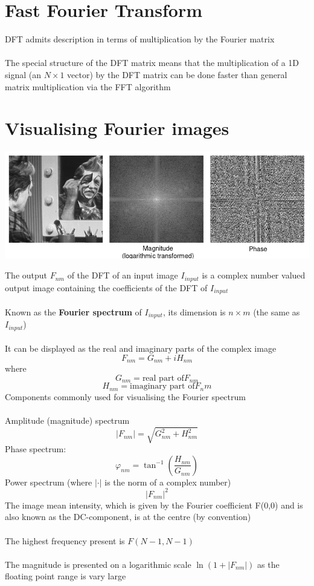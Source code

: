 \documentclass{article}[18pt]
\begin{document}
\section{Fast Fourier Transform}
DFT admits description in terms of multiplication by the Fourier matrix\\
\\
The special structure of the DFT matrix means that the multiplication of a 1D signal (an $N\times 1$ vector) by the DFT matrix can be done faster than general matrix multiplication via the FFT algorithm
\section{Visualising Fourier images}
\begin{center}
	\includegraphics[scale=0.7]{visualise}
\end{center}

The output $F_{nm}$ of the DFT of an input image $I_{input}$ is a complex number valued output image containing the coefficients of the DFT of $I_{input}$\\
\\
Known as the \textbf{Fourier spectrum} of $I_{input}$, its dimension is $n\times m$ (the same as $I_{input}$)\\
\\
It can be displayed as the real and imaginary parts of the complex image
$$F_{nm}=G_{nm}+iH_{nm}$$
where
$$G_{nm} = \text{real part of} F_{nm}$$
$$H_{nm} = \text{imaginary part of} F_nm$$
Components commonly used for visualising the Fourier spectrum\\
\\
Amplitude (magnitude) spectrum
\[
\left|F_{n m}\right|=\sqrt{G_{n m}^{2}+H_{n m}^{2}}
\]
Phase spectrum:
\[
\varphi_{n m}=\tan ^{-1}\left(\frac{H_{n m}}{G_{n m}}\right)
\]
Power spectrum (where $|\cdot|$ is the norm of a complex number)
$$|F_{nm}|^2$$
The image mean intensity, which is given by the Fourier coefficient F(0,0) and is also known as the DC-component, is at the centre (by convention)\\
\\
The highest frequency present is $F(N-1,N-1)$\\
\\
The magnitude is presented on a logarithmic scale $\ln(1+|F_{nm}|)$ as the floating point range is vary large
\end{document}
